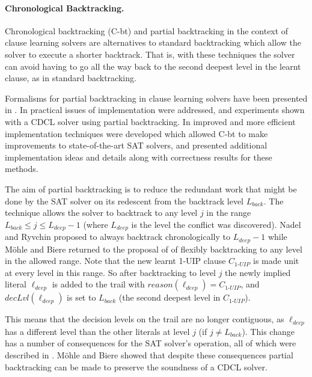 \documentclass[runningheads]{llncs}
\newcommand{\sat}{SAT\xspace}
\newcommand{\dlevel}[1]{\ensuremath{\mathit{decLvl}(#1)}}
\newcommand{\reason}[1]{\ensuremath{\mathit{reason}(#1)}}
\newcommand{\uipcls}{C_{\textit{1-UIP}}}
\newcommand{\deepestLvl}{L_{\textit{deep}}}
\newcommand{\deepestLit}{\ell_{\textit{deep}}}
\newcommand{\btL}{L_{\textit{back}}}
\newcommand{\cbt}{C-bt\xspace}
\begin{document}
\paragraph{Chronological Backtracking.}
Chronological backtracking (\cbt) and partial backtracking in the
context of clause learning solvers are alternatives to standard
backtracking which allow the solver to execute a shorter
backtrack. That is, with these techniques the solver can avoid having
to go all the way back to the second deepest level in the learnt
clause, as in standard backtracking.

Formalisms for partial backtracking in clause learning solvers have
been presented in
\cite{DBLP:journals/jacm/NieuwenhuisOT06,nadelPhD}. In
\cite{DBLP:conf/lpar/JiangZ13} practical issues of implementation were
addressed, and experiments shown with a CDCL solver using partial
backtracking. In \cite{DBLP:conf/sat/NadelR18} improved and more
efficient implementation techniques were developed which allowed \cbt
to make improvements to state-of-the-art \sat solvers, and
\cite{DBLP:conf/sat/MohleB19} presented additional implementation
ideas and details along with correctness results for these methods.

The aim of partial backtracking is to reduce the redundant work that
might be done by the \sat solver on its redescent from the backtrack
level $\btL$. The technique allows the solver to backtrack to any
level $j$ in the range $\btL \leq j \leq \deepestLvl{-}1$ (where
$\deepestLvl$ is the level the conflict was discovered). Nadel and
Ryvchin \cite{DBLP:conf/sat/NadelR18} proposed to always backtrack
chronologically to $\deepestLvl{-}1$ while M{\"{o}}hle and Biere
\cite{DBLP:conf/sat/MohleB19} returned to the proposal of
\cite{DBLP:conf/lpar/JiangZ13} of flexibly backtracking to any level
in the allowed range. Note that the new learnt 1-UIP clause $\uipcls$
is made unit at every level in this range. So after backtracking to
level $j$ the newly implied literal $\deepestLit$ is added to the
trail with $\reason{\deepestLit}=\uipcls$, and $\dlevel{\deepestLit}$
is set to $\btL$ (the second deepest level in $\uipcls$).

This means that the decision levels on the trail are no longer
contiguous, as $\deepestLit$ has a different level than the other
literals at level $j$ (if $j\neq \btL$). This change has a number of
consequences for the \sat solver's operation, all of which were
described in \cite{DBLP:conf/lpar/JiangZ13}. M{\"{o}}hle and Biere
\cite{DBLP:conf/satt/MohleB19} showed that despite these consequences
partial backtracking can be made to preserve the soundness of a CDCL
solver.
\end{document}
